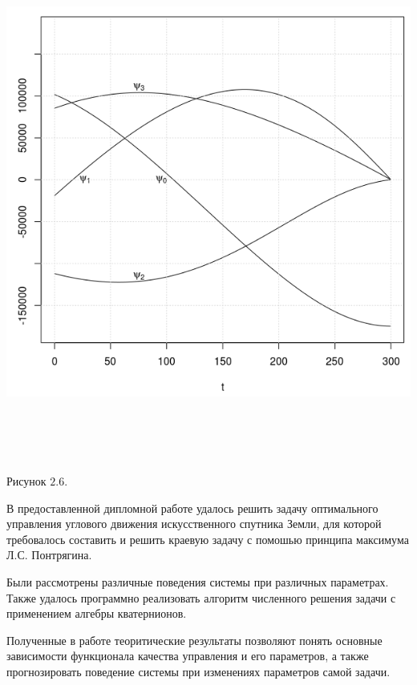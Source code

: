 \documentclass[14pt]{extreport}
\begin{document}
\begin{center}
\vspace*{50px}
\includegraphics[width=17cm, height=17cm]{p300.png}

Рисунок $2.6$. 
\end{center}

\conclusions

В предоставленной дипломной работе удалось решить задачу оптимального управления углового движения искусственного спутника Земли, 
для которой требовалось составить и решить краевую задачу с помошью принципа максимума Л.С. Понтрягина. 

Были рассмотрены различные поведения системы при различных параметрах. Также удалось программно реализовать алгоритм численного решения задачи
с применением алгебры кватернионов.

Полученные в работе теоритические результаты позволяют понять основные зависимости функционала качества управления и его параметров,
а также прогнозировать поведение системы при изменениях параметров самой задачи.
\end{document}
